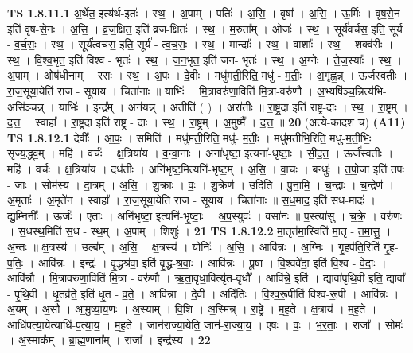\documentclass[17pt]{extarticle}
\begin{document}
                                \textbf{ TS 1.8.11.1} \newline
                  अ॒र्थेत॒ इत्य॑र्थ-इतः॑ । स्थ॒ । अ॒पाम् । पतिः॑ । अ॒सि॒ । वृषा᳚ । अ॒सि॒ । ऊ॒र्मिः । वृ॒ष॒से॒न इति॑ वृष-से॒नः । अ॒सि॒ । व्र॒ज॒क्षित॒ इति॑ व्रज-क्षितः॑ । स्थ॒ । म॒रुता᳚म् । ओजः॑ । स्थ॒ । सूर्य॑वर्चस॒ इति॒ सूर्य॑ - व॒र्च॒सः॒ । स्थ॒ । सूर्य॑त्वचस॒ इति॒ सूर्य॑ - त्व॒च॒सः॒ । स्थ॒ । मान्दाः᳚ । स्थ॒ । वाशाः᳚ । स्थ॒ । शक्व॑रीः । स्थ॒ । वि॒श्व॒भृत॒ इति॑ विश्व - भृतः॑ । स्थ॒ । ज॒न॒भृत॒ इति॑ जन- भृतः॑ । स्थ॒ । अ॒ग्नेः । ते॒ज॒स्याः᳚ । स्थ॒ । अ॒पाम् । ओष॑धीनाम् । रसः॑ । स्थ॒ । अ॒पः । दे॒वीः । मधु॑मती॒रिति॒ मधु॑ - म॒तीः॒ । अ॒गृ॒ह्ण॒न्न् । ऊर्ज॑स्वतीः । रा॒ज॒सूया॒येति॑ राज - सूया॑य । चिता॑नाः ॥ याभिः॑ । मि॒त्रावरु॑णा॒विति॑ मि॒त्रा-वरु॑णौ । अ॒भ्यषि॑ञ्च॒न्नित्य॑भि-असि॑ञ्चन्न् । याभिः॑ । इन्द्र᳚म् । अन॑यन्न् । अतीति॑ ( ) । अरा॑तीः ॥ रा॒ष्ट्र॒दा इति॑ राष्ट्र-दाः । स्थ॒ । रा॒ष्ट्रम् । द॒त्त॒ । स्वाहा᳚ । रा॒ष्ट्र॒दा इति॑ राष्ट्र - दाः । स्थ॒ । रा॒ष्ट्रम् । अ॒मुष्मै᳚ । द॒त्त॒ ॥ \textbf{  20 } \newline
                  \newline
                      (अत्ये-का॑दश च)  \textbf{(A11)} \newline \newline
                                \textbf{ TS 1.8.12.1} \newline
                  देवीः᳚ । आ॒पः॒ । समिति॑ । मधु॑मती॒रिति॒ मधु॑- म॒तीः॒ । मधु॑मतीभि॒रिति॒ मधु॑-म॒ती॒भिः॒ । सृ॒ज्य॒द्ध्व॒म् । महि॑ । वर्चः॑ । क्ष॒त्रिया॑य । व॒न्वा॒नाः । अना॑धृष्टा॒ इत्यना᳚-धृ॒ष्टाः॒ । सी॒द॒त॒ । ऊर्ज॑स्वतीः । महि॑ । वर्चः॑ । क्ष॒त्रिया॑य । दध॑तीः । अनि॑भृष्ट॒मित्यनि॑-भृ॒ष्ट॒म् । अ॒सि॒ । वा॒चः । बन्धुः॑ । त॒पो॒जा इति॑ तपः - जाः । सोम॑स्य । दा॒त्रम् । अ॒सि॒ । शु॒क्राः । वः॒ । शु॒क्रेण॑ । उदिति॑ । पु॒ना॒मि॒ । च॒न्द्राः । च॒न्द्रेण॑ । अ॒मृताः᳚ । अ॒मृते॑न । स्वाहा᳚ । रा॒ज॒सूया॒येति॑ राज - सूया॑य । चिता॑नाः ॥ स॒ध॒माद॒ इति॑ सध-मादः॑ । द्यु॒म्निनीः᳚ । ऊर्जः॑ । ए॒ताः । अनि॑भृष्टा॒ इत्यनि॑-भृ॒ष्टाः॒ । अ॒प॒स्युवः॑ । वसा॑नः ॥ प॒स्त्या॑सु । च॒क्रे॒ । वरु॑णः । स॒धस्थ॒मिति॑ स॒ध - स्थ॒म् । अ॒पाम् । शिशुः॑ । \textbf{  21} \newline
                  \newline
                                \textbf{ TS 1.8.12.2} \newline
                  मा॒तृत॑मा॒स्विति॑ मा॒तृ - त॒मा॒सु॒ । अ॒न्तः ॥ क्ष॒त्रस्य॑ । उल्ब᳚म् । अ॒सि॒ । क्ष॒त्रस्य॑ । योनिः॑ । अ॒सि॒ । आवि॑न्नः । अ॒ग्निः । गृ॒हप॑ति॒रिति॑ गृ॒ह-प॒तिः॒ । आवि॑न्नः । इन्द्रः॑ । वृ॒द्धश्र॑वा॒ इति॑ वृ॒द्ध-श्र॒वाः॒ । आवि॑न्नः । पू॒षा । वि॒श्ववे॑दा॒ इति॑ वि॒श्व - वे॒दाः॒ । आवि॑न्नौ । मि॒त्रावरु॑णा॒विति॑ मि॒त्रा - वरु॑णौ । ऋ॒ता॒वृधा॒वित्यृ॑त-वृधौ᳚ । आवि॑न्ने॒ इति॑ । द्यावा॑पृथि॒वी इति॒ द्यावा᳚ - पृ॒थि॒वी । धृ॒तव्र॑ते॒ इति॑ धृ॒त - व्र॒ते॒ । आवि॑न्ना । दे॒वी । अदि॑तिः । वि॒श्व॒रू॒पीति॑ विश्व-रू॒पी । आवि॑न्नः । अ॒यम् । अ॒सौ । आ॒मु॒ष्या॒य॒णः । अ॒स्याम् । वि॒शि । अ॒स्मिन्न् । रा॒ष्ट्रे । म॒ह॒ते । क्ष॒त्राय॑ । म॒ह॒ते । आधि॑पत्या॒येत्याधि॑-प॒त्या॒य॒ । म॒ह॒ते । जान॑राज्या॒येति॒ जान॑-रा॒ज्या॒य॒ । ए॒षः । वः॒ । भ॒र॒ताः॒ । राजा᳚ । सोमः॑ । अ॒स्माक᳚म् । ब्रा॒ह्म॒णाना᳚म् । राजा᳚ । इन्द्र॑स्य । \textbf{  22} \newline
\end{document}
